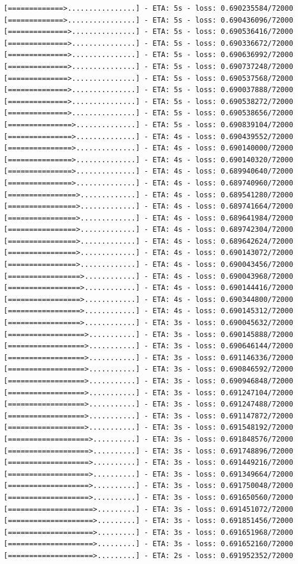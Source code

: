 \documentclass[12pt,fleqn]{article}\usepackage{../../common}
\begin{document}
\begin{verbatim}
[=============>................] - ETA: 5s - loss: 0.690235584/72000 [=============>................] - ETA: 5s - loss: 0.690436096/72000 [==============>...............] - ETA: 5s - loss: 0.690536416/72000 [==============>...............] - ETA: 5s - loss: 0.690336672/72000 [==============>...............] - ETA: 5s - loss: 0.690636992/72000 [==============>...............] - ETA: 5s - loss: 0.690737248/72000 [==============>...............] - ETA: 5s - loss: 0.690537568/72000 [==============>...............] - ETA: 5s - loss: 0.690037888/72000 [==============>...............] - ETA: 5s - loss: 0.690538272/72000 [==============>...............] - ETA: 5s - loss: 0.690538656/72000 [===============>..............] - ETA: 5s - loss: 0.690839104/72000 [===============>..............] - ETA: 4s - loss: 0.690439552/72000 [===============>..............] - ETA: 4s - loss: 0.690140000/72000 [===============>..............] - ETA: 4s - loss: 0.690140320/72000 [===============>..............] - ETA: 4s - loss: 0.689940640/72000 [===============>..............] - ETA: 4s - loss: 0.689740960/72000 [================>.............] - ETA: 4s - loss: 0.689541280/72000 [================>.............] - ETA: 4s - loss: 0.689741664/72000 [================>.............] - ETA: 4s - loss: 0.689641984/72000 [================>.............] - ETA: 4s - loss: 0.689742304/72000 [================>.............] - ETA: 4s - loss: 0.689642624/72000 [================>.............] - ETA: 4s - loss: 0.690143072/72000 [================>.............] - ETA: 4s - loss: 0.690043456/72000 [=================>............] - ETA: 4s - loss: 0.690043968/72000 [=================>............] - ETA: 4s - loss: 0.690144416/72000 [=================>............] - ETA: 4s - loss: 0.690344800/72000 [=================>............] - ETA: 4s - loss: 0.690145312/72000 [=================>............] - ETA: 3s - loss: 0.690045632/72000 [==================>...........] - ETA: 3s - loss: 0.690145888/72000 [==================>...........] - ETA: 3s - loss: 0.690646144/72000 [==================>...........] - ETA: 3s - loss: 0.691146336/72000 [==================>...........] - ETA: 3s - loss: 0.690846592/72000 [==================>...........] - ETA: 3s - loss: 0.690946848/72000 [==================>...........] - ETA: 3s - loss: 0.691247104/72000 [==================>...........] - ETA: 3s - loss: 0.691247488/72000 [==================>...........] - ETA: 3s - loss: 0.691147872/72000 [==================>...........] - ETA: 3s - loss: 0.691548192/72000 [===================>..........] - ETA: 3s - loss: 0.691848576/72000 [===================>..........] - ETA: 3s - loss: 0.691748896/72000 [===================>..........] - ETA: 3s - loss: 0.691449216/72000 [===================>..........] - ETA: 3s - loss: 0.691349664/72000 [===================>..........] - ETA: 3s - loss: 0.691750048/72000 [===================>..........] - ETA: 3s - loss: 0.691650560/72000 [====================>.........] - ETA: 3s - loss: 0.691451072/72000 [====================>.........] - ETA: 3s - loss: 0.691851456/72000 [====================>.........] - ETA: 3s - loss: 0.691651968/72000 [====================>.........] - ETA: 3s - loss: 0.691652160/72000 [====================>.........] - ETA: 2s - loss: 0.691952352/72000 
\end{verbatim}
\end{document}
